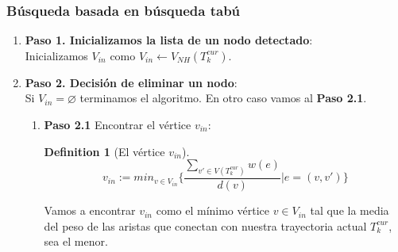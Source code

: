 \documentclass[letter,10pt]{article}
\theoremstyle{definition}
\newtheorem{definition}{Definition}[section]
\begin{document}
\subsubsection{Búsqueda basada en búsqueda tabú}
\begin{enumerate}{}
    \item[] \textbf{Paso 1. Inicializamos la lista de un nodo detectado}:\\
    Inicializamos $V_{in}$ como $V_{in} \leftarrow V_{NH}(T^{cur}_k)$.
    \item[] \textbf{Paso 2. Decisión de eliminar un nodo}:\\
    Si $V_{in}= \varnothing $ terminamos el algoritmo. En otro caso vamos al \textbf{Paso 2.1}.
    \begin{enumerate}
        \item[] \textbf{Paso 2.1} Encontrar el vértice $v_{in}$:\\
        \begin{definition}[El vértice $v_{in}$]
            \[
                v_{in} := 
                min_{v\in V_{in}}
                    \Bigg \{ \frac{\sum_{v'\in V(T^{cur}_k )} w(e)}{d(v)} \Big | e = (v,v')
                    \Bigg \} 
            \]
        \end{definition}
        Vamos a encontrar $v_{in}$ como el mínimo vértice $v\in V_{in}$ tal que la media del peso de las aristas que conectan con nuestra trayectoria actual $T^{cur}_k$, sea el menor.\\
        

\end{enumerate}
\end{enumerate}
\end{document}
